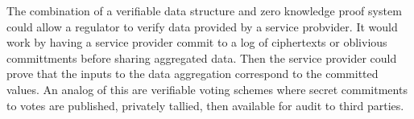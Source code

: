 \documentclass[nobib]{tufte-handout}
\begin{document}
The combination of a verifiable data structure and zero knowledge proof system
could allow a regulator to verify data provided by a service probvider. It would
work by having a service provider commit to a log of ciphertexts or oblivious
committments before sharing aggregated data. Then the service provider could
prove that the inputs to the data aggregation correspond to the committed
values. An analog of this are verifiable voting schemes where secret commitments
to votes are published, privately tallied, then available for audit to third
parties.

 
\end{document}
